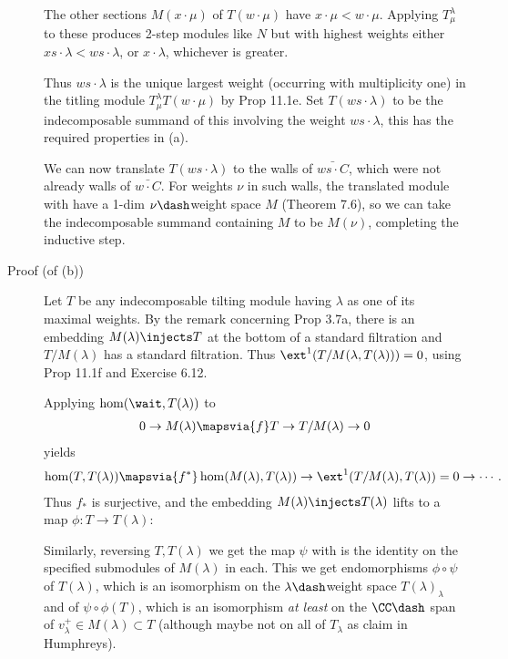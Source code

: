 \begin{description}
The other sections \(M(x\cdot \mu)\) of \(T(w\cdot \mu)\) have
\(x\cdot \mu < w\cdot \mu\). Applying \(T_\mu^\lambda\) to these
produces 2-step modules like \(N\) but with highest weights either
\(xs \cdot \lambda < ws\cdot \lambda\), or \(x\cdot \lambda\), whichever
is greater.

\hfill\break

Thus \(ws \cdot \lambda\) is the unique largest weight (occurring with
multiplicity one) in the titling module \(T_\mu^\lambda T(w\cdot \mu)\)
by Prop 11.1e. Set \(T(ws\cdot \lambda)\) to be the indecomposable
summand of this involving the weight \(ws\cdot \lambda\), this has the
required properties in (a).

\hfill\break

We can now translate \(T(ws\cdot \lambda)\) to the walls of
\(\bar{ws\cdot C}\), which were not already walls of \(\bar{w\cdot C}\).
For weights \(\nu\) in such walls, the translated module with have a
1-dim \(\nu\dash\)weight space \(M\) (Theorem 7.6), so we can take the
indecomposable summand containing \(M\) to be \(M(\nu)\), completing the
inductive step.
\item[Proof (of (b))]
Let \(T\) be any indecomposable tilting module having \(\lambda\) as one
of its maximal weights. By the remark concerning Prop 3.7a, there is an
embedding \(M(\lambda) \injects T\) at the bottom of a standard
filtration and \(T/M(\lambda)\) has a standard filtration. Thus
\(\ext^1(T/M(\lambda, T(\lambda))) = 0\), using Prop 11.1f and Exercise
6.12.

Applying \(\hom(\wait, T(\lambda))\) to
\begin{align*}0 \to M(\lambda) \mapsvia{f} T \to T/M(\lambda) \to 0\end{align*}
yields
\begin{align*}\hom(T, T(\lambda)) \mapsvia{f^*} \hom(M(\lambda), T(\lambda)) \to \ext^1(T/M(\lambda), T(\lambda)) = 0 \to \cdots.\end{align*}
Thus \(f_*\) is surjective, and the embedding
\(M(\lambda) \injects T(\lambda)\) lifts to a map
\(\phi: T\to T(\lambda)\):

\begin{center}
\end{center}

Similarly, reversing \(T, T(\lambda)\) we get the map \(\psi\) with is
the identity on the specified submodules of \(M(\lambda)\) in each. This
we get endomorphisms \(\phi \circ \psi\) of \(T(\lambda)\), which is an
isomorphism on the \(\lambda\dash\)weight space \(T(\lambda)_\lambda\)
and of \(\psi\circ \phi(T)\), which is an isomorphism \emph{at least} on
the \(\CC\dash\) span of \(v_\lambda^+ \in M(\lambda) \subset T\)
(although maybe not on all of \(T_\lambda\) as claim in Humphreys).


\end{description}
